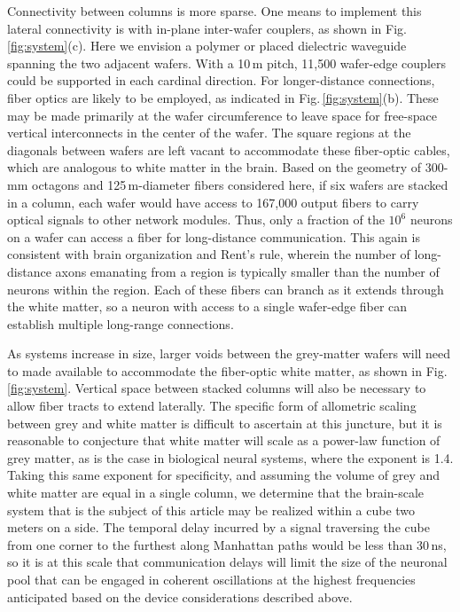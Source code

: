 \documentclass[twocolumn]{article}
\begin{document}
Connectivity between columns is more sparse. One means to implement this lateral connectivity is with in-plane inter-wafer couplers, as shown in Fig.\,\ref{fig:system}(c). Here we envision a polymer or placed dielectric waveguide spanning the two adjacent wafers. With a 10\,\textmu m pitch, 11,500 wafer-edge couplers could be supported in each cardinal direction. For longer-distance connections, fiber optics are likely to be employed, as indicated in Fig.\,\ref{fig:system}(b). These may be made primarily at the wafer circumference to leave space for free-space vertical interconnects in the center of the wafer. The square regions at the diagonals between wafers are left vacant to accommodate these fiber-optic cables, which are analogous to white matter in the brain. Based on the geometry of 300-mm octagons and 125\,\textmu m-diameter fibers considered here, if six wafers are stacked in a column, each wafer would have access to 167,000 output fibers to carry optical signals to other network modules. Thus, only a fraction of the $10^6$ neurons on a wafer can access a fiber for long-distance communication. This again is consistent with brain organization and Rent's rule, wherein the number of long-distance axons emanating from a region is typically smaller than the number of neurons within the region. Each of these fibers can branch as it extends through the white matter, so a neuron with access to a single wafer-edge fiber can establish multiple long-range connections.

As systems increase in size, larger voids between the grey-matter wafers will need to made available to accommodate the fiber-optic white matter, as shown in Fig.\,\ref{fig:system}. Vertical space between stacked columns will also be necessary to allow fiber tracts to extend laterally. The specific form of allometric scaling between grey and white matter is difficult to ascertain at this juncture, but it is reasonable to conjecture that white matter will scale as a power-law function of grey matter, as is the case in biological neural systems, where the exponent is 1.4. Taking this same exponent for specificity, and assuming the volume of grey and white matter are equal in a single column, we determine that the brain-scale system that is the subject of this article may be realized within a cube two meters on a side. The temporal delay incurred by a signal traversing the cube from one corner to the furthest along Manhattan paths would be less than 30\,ns, so it is at this scale that communication delays will limit the size of the neuronal pool that can be engaged in coherent oscillations at the highest frequencies anticipated based on the device considerations described above. 
\end{document}
